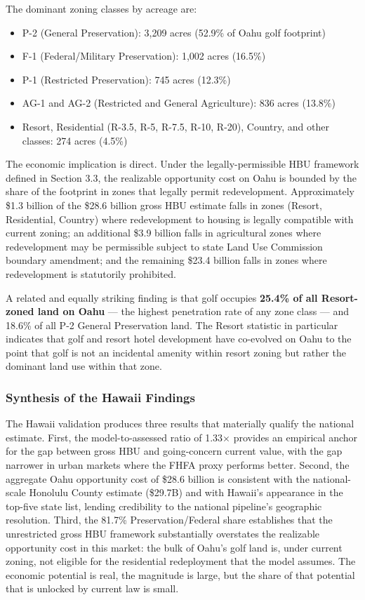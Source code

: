 \documentclass[11pt, letterpaper]{article}
\begin{document}
The dominant zoning classes by acreage are:

\begin{itemize}[leftmargin=*]
    \item P-2 (General Preservation): 3,209 acres (52.9\% of Oahu golf footprint)
    \item F-1 (Federal/Military Preservation): 1,002 acres (16.5\%)
    \item P-1 (Restricted Preservation): 745 acres (12.3\%)
    \item AG-1 and AG-2 (Restricted and General Agriculture): 836 acres (13.8\%)
    \item Resort, Residential (R-3.5, R-5, R-7.5, R-10, R-20), Country, and other classes: 274 acres (4.5\%)
\end{itemize}

The economic implication is direct. Under the legally-permissible HBU framework defined in Section 3.3, the realizable opportunity cost on Oahu is bounded by the share of the footprint in zones that legally permit redevelopment. Approximately \$1.3 billion of the \$28.6 billion gross HBU estimate falls in zones (Resort, Residential, Country) where redevelopment to housing is legally compatible with current zoning; an additional \$3.9 billion falls in agricultural zones where redevelopment may be permissible subject to state Land Use Commission boundary amendment; and the remaining \$23.4 billion falls in zones where redevelopment is statutorily prohibited.

A related and equally striking finding is that golf occupies \textbf{25.4\% of all Resort-zoned land on Oahu} --- the highest penetration rate of any zone class --- and 18.6\% of all P-2 General Preservation land. The Resort statistic in particular indicates that golf and resort hotel development have co-evolved on Oahu to the point that golf is not an incidental amenity within resort zoning but rather the dominant land use within that zone.

\subsubsection{Synthesis of the Hawaii Findings}

The Hawaii validation produces three results that materially qualify the national estimate. First, the model-to-assessed ratio of 1.33$\times$ provides an empirical anchor for the gap between gross HBU and going-concern current value, with the gap narrower in urban markets where the FHFA proxy performs better. Second, the aggregate Oahu opportunity cost of \$28.6 billion is consistent with the national-scale Honolulu County estimate (\$29.7B) and with Hawaii's appearance in the top-five state list, lending credibility to the national pipeline's geographic resolution. Third, the 81.7\% Preservation/Federal share establishes that the unrestricted gross HBU framework substantially overstates the realizable opportunity cost in this market: the bulk of Oahu's golf land is, under current zoning, not eligible for the residential redeployment that the model assumes. The economic potential is real, the magnitude is large, but the share of that potential that is unlocked by current law is small.
\end{document}
